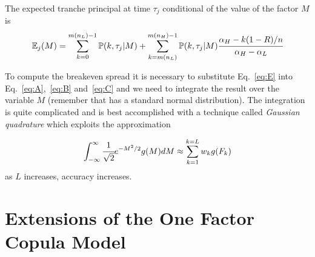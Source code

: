 The expected tranche principal at time $\tau_j$ conditional of the value of the factor $M$ is
\begin{equation}
\mathbb{E}_j(M) = \sum_{k=0}^{m(n_L)-1}\mathbb{P}(k, \tau_j|M) + \sum_{k=m(n_L)}^{m(n_H)-1}\mathbb{P}(k, \tau_j|M) \cfrac{\alpha_H -k(1-R)/n}{\alpha_H - \alpha_L}
\label{eq:E}
\end{equation}

To compute the breakeven spread it is necessary to substitute Eq.~\ref{eq:E} into Eq.~\ref{eq:A},~\ref{eq:B} and~\ref{eq:C}
and we need to integrate the result over the variable $M$ (remember that has a standard normal distribution). 
The integration is quite complicated and is best accomplished with a technique called \emph{Gaussian quadrature} which
exploits the approximation

\[\int_{-\infty}^{\infty}{\cfrac{1}{\sqrt{2}}e^{-M^{2}/2}g(M)dM} \approx \sum_{k=1}^{k=L}w_k g(F_k)\]
as $L$ increases, accuracy increases.

\section{Extensions of the One Factor Copula Model}

